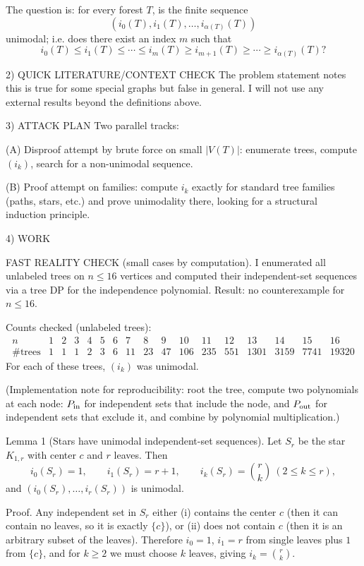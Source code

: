 The question is: for every forest $T$, is the finite sequence
\[
(i_0(T),i_1(T),\dots,i_{\alpha(T)}(T))
\]
unimodal; i.e. does there exist an index $m$ such that
\[
 i_0(T)\le i_1(T)\le\cdots\le i_m(T)\ge i_{m+1}(T)\ge\cdots\ge i_{\alpha(T)}(T)?
\]

2) QUICK LITERATURE/CONTEXT CHECK
The problem statement notes this is true for some special graphs but false in general.  I will not use any external results beyond the definitions above.

3) ATTACK PLAN
Two parallel tracks:

(A) Disproof attempt by brute force on small $|V(T)|$: enumerate trees, compute $(i_k)$, search for a non-unimodal sequence.

(B) Proof attempt on families: compute $i_k$ exactly for standard tree families (paths, stars, etc.) and prove unimodality there, looking for a structural induction principle.

4) WORK

FAST REALITY CHECK (small cases by computation).
I enumerated all unlabeled trees on $n\le 16$ vertices and computed their independent-set sequences via a tree DP for the independence polynomial.  Result: no counterexample for $n\le 16$.

Counts checked (unlabeled trees):
\[
\begin{array}{c|cccccccccccccccc}
 n & 1&2&3&4&5&6&7&8&9&10&11&12&13&14&15&16\\\hline
 \#\text{trees} & 1&1&1&2&3&6&11&23&47&106&235&551&1301&3159&7741&19320
\end{array}
\]
For each of these trees, $(i_k)$ was unimodal.

(Implementation note for reproducibility: root the tree, compute two polynomials at each node: $P_{\rm in}$ for independent sets that include the node, and $P_{\rm out}$ for independent sets that exclude it, and combine by polynomial multiplication.)

Lemma 1 (Stars have unimodal independent-set sequences).
Let $S_r$ be the star $K_{1,r}$ with center $c$ and $r$ leaves.  Then
\[
 i_0(S_r)=1,\qquad i_1(S_r)=r+1,\qquad i_k(S_r)=\binom{r}{k}\ (2\le k\le r),
\]
and $(i_0(S_r),\dots,i_r(S_r))$ is unimodal.

Proof.
Any independent set in $S_r$ either (i) contains the center $c$ (then it can contain no leaves, so it is exactly $\{c\}$), or (ii) does not contain $c$ (then it is an arbitrary subset of the leaves).  Therefore $i_0=1$, $i_1=r$ from single leaves plus $1$ from $\{c\}$, and for $k\ge 2$ we must choose $k$ leaves, giving $i_k=\binom{r}{k}$.

